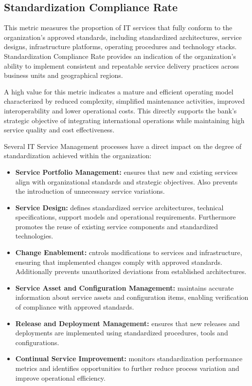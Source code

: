 \subsection{Standardization Compliance Rate}
\label{sub:stdCompliaceRate}

This metric measures the proportion of IT services that fully conform to the organization's approved standards, including standardized architectures, service designs, infrastructure platforms, operating procedures and technology stacks. Standardization Compliance Rate provides an indication of the organization's ability to implement consistent and repeatable service delivery practices across business units and geographical regions.

A high value for this metric indicates a mature and efficient operating model characterized by reduced complexity, simplified maintenance activities, improved interoperability and lower operational costs. This directly supports the bank's strategic objective of integrating international operations while maintaining high service quality and cost effectiveness.

Several IT Service Management processes have a direct impact on the degree of standardization achieved within the organization:

\begin{itemize}
    \item \textbf{Service Portfolio Management:} ensures that new and existing services align with organizational standards and strategic objectives. Also prevents the introduction of unnecessary service variations.
    \item \textbf{Service Design:} defines standardized service architectures, technical specifications, support models and operational requirements. Furthermore promotes the reuse of existing service components and standardized technologies.
    \item \textbf{Change Enablement:} cntrols modifications to services and infrastructure, ensuring that implemented changes comply with approved standards. Additionally prevents unauthorized deviations from established architectures.
    \item \textbf{Service Asset and Configuration Management:} maintains accurate information about service assets and configuration items, enabling verification of compliance with approved standards.
    \item \textbf{Release and Deployment Management:} ensures that new releases and deployments are implemented using standardized procedures, tools and configurations.
    \item \textbf{Continual Service Improvement:} monitors standardization performance metrics and identifies opportunities to further reduce process variation and improve operational efficiency.
\end{itemize}

